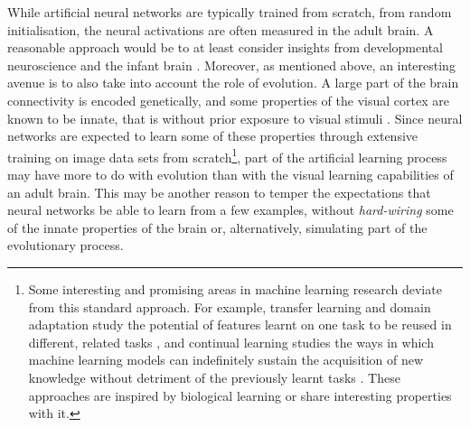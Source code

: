 {While artificial neural networks are typically trained from scratch, from random initialisation, the neural activations are often measured in the adult brain. A reasonable approach would be to at least consider insights from developmental neuroscience and the infant brain \citep{harwerth1986criticalperiods, atkinson2002developmental, gelman2011childcategorization}. Moreover, as mentioned above, an interesting avenue is to also take into account the role of evolution. A large part of the brain connectivity is encoded genetically, and some properties of the visual cortex are known to be innate, that is without prior exposure to visual stimuli \citep{zador2019purelearning}. Since neural networks are expected to learn some of these properties through extensive training on image data sets from scratch\footnote{Some interesting and promising areas in machine learning research deviate from this standard approach. For example, transfer learning and domain adaptation study the potential of features learnt on one task to be reused in different, related tasks \citep{zhuang2019transferlearning}, and continual learning studies the ways in which machine learning models can indefinitely sustain the acquisition of new knowledge without detriment of the previously learnt tasks \citep{aljundi2019continuallearning, mundt2019continuallearning}. These approaches are inspired by biological learning or share interesting properties with it.}, part of the artificial learning process may have more to do with evolution than with the visual learning capabilities of an adult brain. This may be another reason to temper the expectations that neural networks be able to learn from a few examples, without \textit{hard-wiring} some of the innate properties of the brain \citep{lindsey2019bioconstraints, malhotra2020bioconstraints} or, alternatively, simulating part of the evolutionary process.

}
